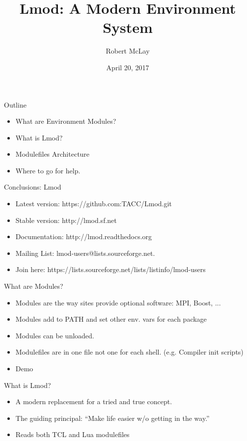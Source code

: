 \documentclass[dvipsnames,aspectratio=169]{beamer}
\begin{document}
\title[Lmod]{Lmod: A Modern Environment System}
\author{Robert McLay} 
\date{April 20, 2017} 



\frame{\titlepage} 

\begin{frame}{Outline}
  \begin{itemize}
    \item What are Environment Modules?
    \item What is Lmod?
    \item Modulefiles Architecture
    \item Where to go for help.
  \end{itemize}
\end{frame}

\begin{frame}{Conclusions: Lmod}
  \begin{itemize}
    \item Latest version: https://github.com:TACC/Lmod.git
    \item Stable version: http://lmod.sf.net
    \item Documentation:  http://lmod.readthedocs.org
    \item Mailing List:   lmod-users@lists.sourceforge.net.
    \item Join here: https://lists.sourceforge.net/lists/listinfo/lmod-users
  \end{itemize}
\end{frame}

\begin{frame}{What are Modules?}
  \begin{itemize}
    \item Modules are the way sites provide optional software: MPI,
      Boost, ...
    \item Modules add to PATH and set other env. vars for each package
    \item Modules can be unloaded.
    \item Modulefiles are in one file not one for each
      shell. (e.g. Compiler init scripts)
    \item Demo
  \end{itemize}
\end{frame}

\begin{frame}{What is Lmod?}
  \begin{itemize}
    \item A modern replacement for a tried and true concept.
    \item The guiding principal: ``Make life easier w/o getting in
      the way.''
    \item Reads both TCL and Lua modulefiles
  \end{itemize}
\end{frame}
\end{document}
